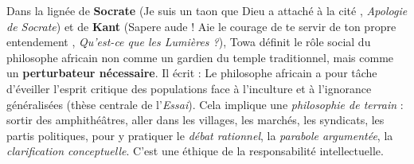 \documentclass[11pt]{article}
\begin{document}
\begin{propriete}
Dans la lignée de \textbf{Socrate} (\guillemotleft Je suis un taon que Dieu a attaché à la cité \guillemotright, \emph{Apologie de Socrate}) et de \textbf{Kant} (\guillemotleft Sapere aude ! Aie le courage de te servir de ton propre entendement \guillemotright, \emph{Qu'est-ce que les Lumières ?}), Towa définit le rôle social du philosophe africain non comme un gardien du temple traditionnel, mais comme un \textbf{perturbateur nécessaire}. Il écrit : \guillemotleft Le philosophe africain a pour tâche d'éveiller l'esprit critique des populations face à l'inculture et à l'ignorance généralisées \guillemotright (thèse centrale de l'\emph{Essai}). Cela implique une \emph{philosophie de terrain} : sortir des amphithéâtres, aller dans les villages, les marchés, les syndicats, les partis politiques, pour y pratiquer le \emph{débat rationnel}, la \emph{parabole argumentée}, la \emph{clarification conceptuelle}. C'est une éthique de la responsabilité intellectuelle.
\end{propriete}
\end{document}
